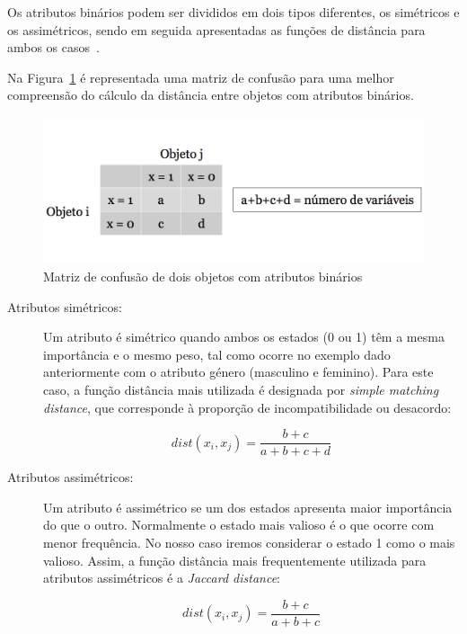 Os atributos binários podem ser divididos em dois tipos  diferentes, os simétricos e os assimétricos, sendo em seguida apresentadas as funções de distância para ambos os casos~\citet{Liu2011}.

Na Figura~\ref{fig:matriz_confusão} é representada uma matriz de confusão para uma melhor compreensão do cálculo da distância entre objetos com atributos binários.

\begin{figure}[h]
\centering
\includegraphics[width=0.8\linewidth]{./figures/matriz_confusao}
\caption{Matriz de confusão de dois objetos com atributos binários}
\label{fig:matriz_confusão}
\end{figure}

\begin{description}
\item[Atributos simétricos: ] Um atributo é simétrico quando ambos os estados (0 ou 1) têm a mesma importância e o mesmo peso, tal como ocorre no exemplo dado anteriormente com o atributo género (masculino e feminino). Para este caso, a função distância mais utilizada é designada por \textit{simple matching distance}, que corresponde à proporção de incompatibilidade ou desacordo:  

\begin{equation}
 dist(x_{i}, x_{j}) =  \frac{b + c}{a + b + c + d}
 \label{eq:symetric}   
\end{equation}

\item[Atributos assimétricos: ] Um atributo é assimétrico se um dos estados apresenta maior importância do que o outro. Normalmente o estado mais valioso é o que ocorre com menor frequência. No nosso caso iremos considerar o estado 1 como o mais valioso. Assim, a função distância mais frequentemente utilizada para atributos assimétricos é a \textit{Jaccard distance}:

\begin{equation}
 dist(x_{i}, x_{j}) =  \frac{b + c}{a + b + c}
\label{eq:asymetric}   
\end{equation}

\end{description}

